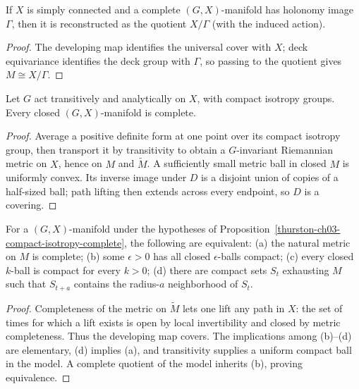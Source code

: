 \begin{proposition}
\label{thurston-ch03-complete-quotient}

If \(X\) is simply connected and a complete \((G,X)\)-manifold has holonomy image \(\Gamma\), then it is reconstructed as the quotient \(X/\Gamma\) (with the induced action).
\end{proposition}
\begin{proof}
\sketch The developing map identifies the universal cover with \(X\); deck equivariance identifies the deck group with \(\Gamma\), so passing to the quotient gives \(M\cong X/\Gamma\).
\end{proof}

\begin{proposition}
\label{thurston-ch03-compact-isotropy-complete}

Let \(G\) act transitively and analytically on \(X\), with compact isotropy groups. Every closed \((G,X)\)-manifold is complete.
\end{proposition}
\begin{proof}
\sketch Average a positive definite form at one point over its compact isotropy group, then transport it by transitivity to obtain a \(G\)-invariant Riemannian metric on \(X\), hence on \(M\) and \(\widetilde M\). A sufficiently small metric ball in closed \(M\) is uniformly convex. Its inverse image under \(D\) is a disjoint union of copies of a half-sized ball; path lifting then extends across every endpoint, so \(D\) is a covering.
\end{proof}

\begin{proposition}
\label{thurston-ch03-metric-completeness}

For a \((G,X)\)-manifold under the hypotheses of Proposition~\ref{thurston-ch03-compact-isotropy-complete}, the following are equivalent: (a) the natural metric on \(M\) is complete; (b) some \(\epsilon>0\) has all closed \(\epsilon\)-balls compact; (c) every closed \(k\)-ball is compact for every \(k>0\); (d) there are compact sets \(S_t\) exhausting \(M\) such that \(S_{t+a}\) contains the radius-\(a\) neighborhood of \(S_t\).
\end{proposition}
\begin{proof}
\sketch Completeness of the metric on \(\widetilde M\) lets one lift any path in \(X\): the set of times for which a lift exists is open by local invertibility and closed by metric completeness. Thus the developing map covers. The implications among (b)--(d) are elementary, (d) implies (a), and transitivity supplies a uniform compact ball in the model. A complete quotient of the model inherits (b), proving equivalence.
\end{proof}


